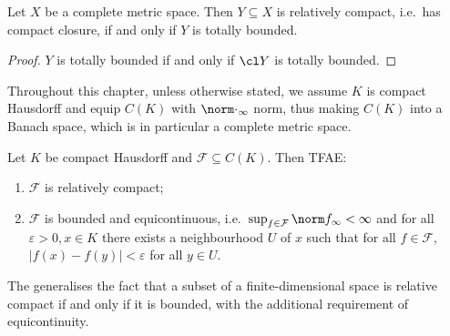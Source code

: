 \documentclass[a4paper]{article}
\begin{document}
\begin{corollary}
  Let \(X\) be a complete metric space. Then \(Y \subseteq X\) is relatively compact, i.e.\ has compact closure, if and only if \(Y\) is totally bounded.
\end{corollary}

\begin{proof}
  \(Y\) is totally bounded if and only if \(\cl Y\) is totally bounded.
\end{proof}

Throughout this chapter, unless otherwise stated, we assume \(K\) is compact Hausdorff and equip \(C(K)\) with \(\norm \cdot_\infty\) norm, thus making \(C(K)\) into a Banach space, which is in particular a complete metric space.

\begin{theorem}
  Let \(K\) be compact Hausdorff and \(\mathcal F \subseteq C(K)\). Then TFAE:
  \begin{enumerate}
  \item \(\mathcal F\) is relatively compact;
  \item \(\mathcal F\) is bounded and equicontinuous, i.e.\ \(\sup_{f \in \mathcal F} \norm f_\infty < \infty\) and for all \(\varepsilon > 0, x \in K\) there exists a neighbourhood \(U\) of \(x\) such that for all \(f \in \mathcal F\), \(|f(x) - f(y)| < \varepsilon\) for all \(y \in U\).
  \end{enumerate}
\end{theorem}

The generalises the fact that a subset of a finite-dimensional space is relative compact if and only if it is bounded, with the additional requirement of equicontinuity.
\end{document}
